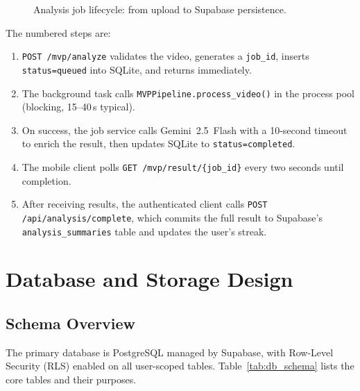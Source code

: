 \begin{figure}[H]
  \centering
  \caption{Analysis job lifecycle: from upload to Supabase persistence.}
  \label{fig:job_lifecycle}
\end{figure}

The numbered steps are:
\begin{enumerate}
  \item \lstinline|POST /mvp/analyze| validates the video, generates a \lstinline|job_id|, inserts \lstinline|status=queued| into SQLite, and returns immediately.
  \item The background task calls \lstinline|MVPPipeline.process_video()| in the process pool (blocking, 15--40\,s typical).
  \item On success, the job service calls Gemini~2.5~Flash with a 10-second timeout to enrich the result, then updates SQLite to \lstinline|status=completed|.
  \item The mobile client polls \lstinline|GET /mvp/result/{job_id}| every two seconds until completion.
  \item After receiving results, the authenticated client calls \lstinline|POST /api/analysis/complete|, which commits the full result to Supabase's \lstinline|analysis_summaries| table and updates the user's streak.
\end{enumerate}

\section{Database and Storage Design}
\label{sec:database}

\subsection{Schema Overview}

The primary database is PostgreSQL managed by Supabase, with Row-Level Security (RLS) enabled on all user-scoped tables. Table~\ref{tab:db_schema} lists the core tables and their purposes.

